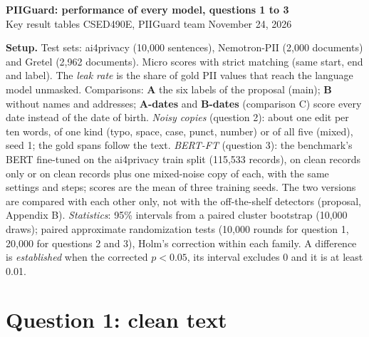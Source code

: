 \documentclass[10pt,a4paper]{article}
\newenvironment{tab}{\par\medskip\noindent\begin{minipage}{\linewidth}\centering\small}{\end{minipage}\par\medskip}
\begin{document}
\begin{center}
{\Large\bfseries PIIGuard: performance of every model, questions 1 to 3}\\[3pt]
{\small Key result tables \textperiodcentered{} CSED490E, PIIGuard team \textperiodcentered{} November 24, 2026}
\end{center}

\textbf{Setup.}
Test sets: ai4privacy (10,000 sentences), Nemotron-PII (2,000 documents) and Gretel (2,962 documents).
Micro scores with strict matching (same start, end and label). The \emph{leak rate} is the share of gold PII
values that reach the language model unmasked. Comparisons: \textbf{A} the six labels of the proposal (main);
\textbf{B} without names and addresses; \textbf{A-dates} and \textbf{B-dates} (comparison C) score every date
instead of the date of birth.
\emph{Noisy copies} (question 2): about one edit per ten words, of one kind (typo, space, case, punct, number) or of
all five (mixed), seed 1; the gold spans follow the text. \emph{BERT-FT} (question 3): the benchmark's BERT
fine-tuned on the ai4privacy train split (115,533 records), on clean records only or on clean records plus one
mixed-noise copy of each, with the same settings and steps; scores are the mean of three training seeds. The two
versions are compared with each other only, not with the off-the-shelf detectors (proposal, Appendix B).
\emph{Statistics}: 95\% intervals from a paired cluster bootstrap (10,000 draws); paired approximate
randomization tests (10,000 rounds for question 1, 20,000 for questions 2 and 3), Holm's correction within each
family. A difference is \emph{established} when the corrected $p<0.05$, its interval excludes 0 and it is at
least 0.01.

\section*{Question 1: clean text}

\begin{tab}

\label{tab:clean}
\end{tab}

\begin{tab}

\label{tab:other}
\end{tab}
\end{document}
